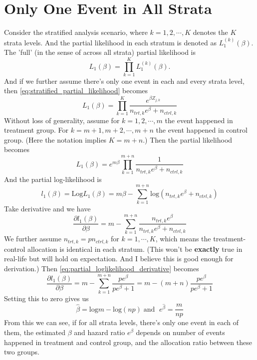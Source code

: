 \documentclass[a4paper,12pt]{article}
\begin{document}
\section{Only One Event in All Strata}
\label{sec:only-one-event-1}

Consider the stratified analysis scenario, where $k = 1, 2, \cdots, K$ denotes the $K$ strata levels. And the partial likelihood in each stratum is denoted as $L_1^{(k)}\left(\beta\right)$. The 'full' (in the sense of across all strata) partial likelihood is
\begin{equation}
  \label{eq:stratified_partial_likelihood}
    L_1\left(\beta\right) = \prod\limits_{k = 1}^KL_1^{(k)}\left(\beta\right).
\end{equation}
And if we further assume there's only one event in each and every strata level, then \eqref{eq:stratified_partial_likelihood} becomes
\[
  L_1\left(\beta\right)
  = \prod\limits_{k = 1}^K
  \frac{e^{\beta Z_{j, k}}}{n_{trt, k}e^{\beta} + n_{ctrl, k}}
\]
Without loss of generality, assume for $k = 1, 2, \cdots, m$ the event happened in treatment group. For $k = m + 1, m+2, \cdots, m+n$ the event happened in control group. (Here the notation implies $K = m + n$.) Then the partial likelihood becomes
\[
  L_1(\beta)
  = e^{m\beta}
  \prod\limits_{k = 1}^{m+n}
  \frac{1}{n_{trt, k}e^{\beta} + n_{ctrl, k}}
\]
And the partial log-likelihood is
\[
  l_1(\beta) = \mathrm{Log}L_1(\beta)
  = m\beta
  - \sum\limits_{k = 1}^{m+n}\mathrm{log}\left(n_{trt,k}e^{\beta} + n_{ctrl, k}\right)
\]
Take derivative and we have
\begin{equation}
  \label{eq:partial_loglikelihood_derivative}
  \frac{\partial l_1\left(\beta\right)}{\partial \beta}
  = m -
  \sum\limits_{k = 1}^{m+n}
  \frac{n_{trt, k}e^\beta}{
    n_{trt, k}e^{\beta} + n_{ctrl, k}
  }
\end{equation}
We further assume $n_{trt, k} = p n_{ctrl, k}$ for $k = 1, \cdots, K$, which means the treatment-control allocation is identical in each stratum. (This won't be \textbf{exactly} true in real-life but will hold on expectation. And I believe this is good enough for derivation.) Then \eqref{eq:partial_loglikelihood_derivative} becomes
\[
  \frac{\partial l_1\left(\beta\right)}{\partial \beta}
  = m -
  \sum\limits_{k = 1}^{m+n}
  \frac{pe^{\beta}}{pe^{\beta} + 1}
  = m -
  \left(m + n\right)
  \frac{pe^{\beta}}{pe^{\beta} + 1}
\]
Setting this to zero gives us
\[
  \hat{\beta} = \mathrm{log}m - \mathrm{log}\left(np\right)
  \;\text{and }\;
  e^{\hat{\beta}} = \frac{m}{np}
\]
From this we can see, if for all strata levels, there's only one event in each of them, the estimated $\beta$ and hazard ratio $e^{\beta}$ depends on number of events happened in treatment and control group, and the allocation ratio between these two groups. 



\end{document}

